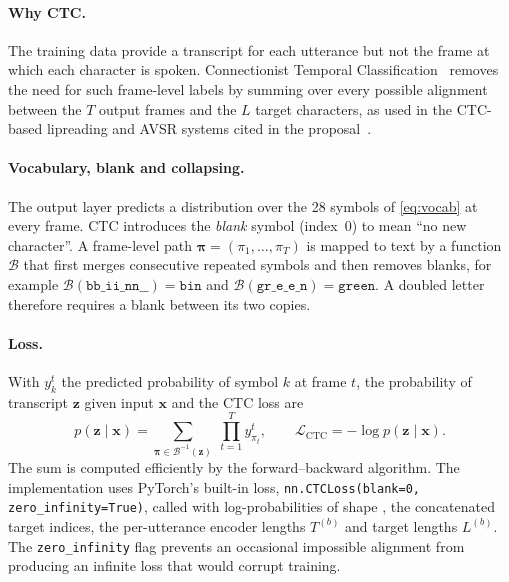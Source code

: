\paragraph{Why CTC.} The training data provide a transcript for each utterance
but not the frame at which each character is spoken. Connectionist Temporal
Classification~\cite{graves2006} removes the need for such frame-level labels
by summing over every possible alignment between the $T$ output frames and the
$L$ target characters, as used in the CTC-based lipreading and AVSR systems
cited in the proposal~\cite{kanavnet2026,afouras2022}.

\paragraph{Vocabulary, blank and collapsing.} The output layer predicts a
distribution over the 28 symbols of \cref{eq:vocab} at every frame. CTC
introduces the \emph{blank} symbol (index~0) to mean ``no new character''. A
frame-level path $\boldsymbol{\pi}=(\pi_1,\dots,\pi_T)$ is mapped to text by a
function $\mathcal{B}$ that first merges consecutive repeated symbols and then
removes blanks, for example
$\mathcal{B}(\texttt{bb\_ii\_nn\_\_}) = \texttt{bin}$ and
$\mathcal{B}(\texttt{gr\_e\_e\_n}) = \texttt{green}$.
A doubled letter therefore requires a blank between its two copies.

\paragraph{Loss.} With $y_k^t$ the predicted probability of symbol $k$ at frame
$t$, the probability of transcript $\mathbf{z}$ given input $\mathbf{x}$ and the
CTC loss are
\begin{equation}
p(\mathbf{z}\mid\mathbf{x}) = \sum_{\boldsymbol{\pi}\in\mathcal{B}^{-1}(\mathbf{z})}\;\prod_{t=1}^{T} y^{t}_{\pi_t},
\qquad
\mathcal{L}_{\text{CTC}} = -\log p(\mathbf{z}\mid\mathbf{x}).
\label{eq:ctc}
\end{equation}
The sum is computed efficiently by the forward--backward algorithm. The
implementation uses PyTorch's built-in loss,
\texttt{nn.CTCLoss(blank=0, zero\_infinity=True)}, called with
log-probabilities of shape , the concatenated target indices, the
per-utterance encoder lengths $T^{(b)}$ and target lengths $L^{(b)}$. The
\texttt{zero\_infinity} flag prevents an occasional impossible alignment from
producing an infinite loss that would corrupt training.

